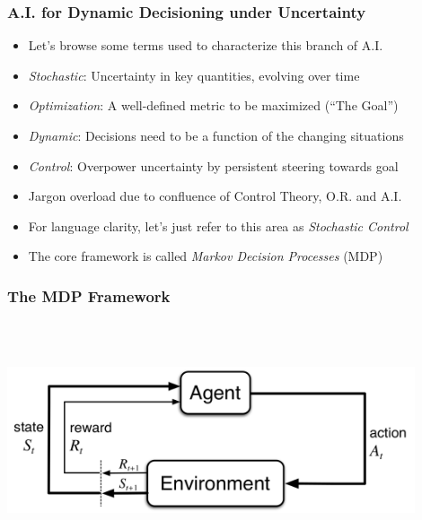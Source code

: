 \documentclass[handout]{beamer}
\begin{document}
\begin{frame}
\frametitle{A.I. for Dynamic Decisioning under Uncertainty}
\pause
\begin{itemize}[<+->]
\item Let's browse some terms used to characterize this branch of A.I.
\item {\em Stochastic}: Uncertainty in key quantities, evolving over time
\item {\em Optimization}: A well-defined metric to be maximized (``The Goal'')
\item {\em Dynamic}:  Decisions need to be a function of the changing situations
\item {\em Control}: Overpower uncertainty by persistent steering towards goal
\item Jargon overload due to confluence of Control Theory, O.R. and A.I.
\item For language clarity, let's just refer to this area as {\em Stochastic Control}
\item The core framework is called {\em Markov Decision Processes} (MDP)
\end{itemize}
\end{frame}



\begin{frame}
\frametitle{The MDP Framework}
\includegraphics[width=12cm, height=7cm]{MDP.png}
\end{frame}
\end{document}
